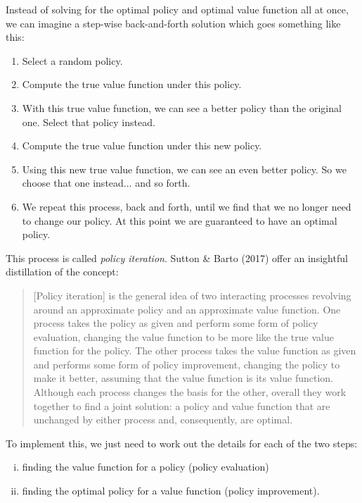 \documentclass[12pt]{article}
\begin{document}
Instead of solving for the optimal policy and optimal value function all at once, we can imagine a step-wise back-and-forth solution which goes something like this:

\begin{enumerate}
\item{Select a random policy.}
\item{Compute the true value function under this policy.}
\item{With this true value function, we can see a better policy than the original one. Select that policy instead.}
\item{Compute the true value function under this new policy.}
\item{Using this new true value function, we can see an even better policy. So we choose that one instead... and so forth.}
\item{We repeat this process, back and forth, until we find that we no longer need to change our policy. At this point we are guaranteed to have an optimal policy.}
\end{enumerate}

This process is called \textit{policy iteration}. Sutton \& Barto (2017) offer an insightful distillation of the concept:

\begin{quote}
[Policy iteration] is the general idea of two interacting processes revolving around an approximate policy and an approximate value function. One process takes the policy as given and perform some form of policy evaluation, changing the value function to be more like the true value function for the policy. The other process takes the value function as given and performs some form of policy improvement, changing the policy to make it better, assuming that the value function is its value function. Although each process changes the basis for the other, overall they work together to find a joint solution: a policy and value function that are unchanged by either process and, consequently, are optimal.
\end{quote}

To implement this, we just need to work out the details for each of the two steps:
\begin{enumerate}[(i)]
\item{finding the value function for a policy (policy evaluation)}
\item{finding the optimal policy for a value function (policy improvement)}.
\end{enumerate}
\end{document}
